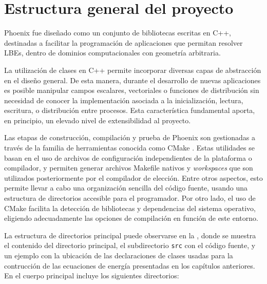 \section{Estructura general del proyecto}

Phoenix fue dise\~nado como un conjunto de bibliotecas escritas en C++, destinadas a facilitar la programaci\'on de aplicaciones que permitan resolver LBEs, dentro de dominios computacionales con geometr\'ia arbitraria. 

La utilizaci\'on de clases en C++ permite incorporar diversas capas de abstracci\'on en el dise\~no general. De esta manera, durante el desarrollo de nuevas aplicaciones es posible manipular campos escalares, vectoriales o funciones de distribuci\'on sin necesidad de conocer la implementaci\'on asociada a la inicializaci\'on, lectura, escritura, o distribuci\'on entre procesos. Esta caracter\'istica fundamental aporta, en principio, un elevado nivel de extensibilidad al proyecto.

Las etapas de construcci\'on, compilaci\'on y prueba de Phoenix son gestionadas a trav\'es de la familia de herramientas conocida como CMake \cite{noauthor_cmake_nodate}. Estas utilidades se basan en el uso de archivos de configuraci\'on independientes de la plataforma o compilador, y permiten generar archivos Makefile nativos y \emph{workspaces} que son utilizados posteriormente por el compilador de elecci\'on. Entre otros aspectos, esto permite llevar a cabo una organizaci\'on sencilla del c\'odigo fuente, usando una estructura de directorios accesible para el programador. Por otro lado, el uso de CMake facilita la detecci\'on de bibliotecas y dependencias del sistema operativo, eligiendo adecuadamente las opciones de compilaci\'on en funci\'on de este entorno.

La estructura de directorios principal puede observarse en la , donde se muestra el contenido del directorio principal, el subdirectorio \texttt{src} con el c\'odigo fuente, y un ejemplo con la ubicaci\'on de las declaraciones de clases usadas para la contrucci\'on de las ecuaciones de energ\'ia presentadas en los cap\'itulos anteriores. En el cuerpo principal incluye los siguientes directorios:

